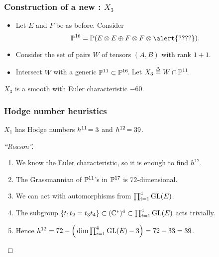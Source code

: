 \begin{frame}
    \frametitle{Construction of a new \CY: $X_3$}

    \begin{itemize}
    	\item
    	Let $E$ and $F$ be as before. Consider
        \[
            \P^{16} = \P(E \otimes E \oplus F \otimes F \otimes\alert{????}).
        \]
        
        \item
        Consider the set of pairs $W$ of tensors $(A, B)$ with rank $1 + 1$.

        \item
        Intersect $W$ with a generic $\P^{11} \subset \P^{16}\mkern-4mu$. Let $X_3 \defeq  W \cap \P^{11}\mkern-4mu$.
    \end{itemize}

    \begin{theorem}
        $X_3$ is a smooth \CY with Euler characteristic $-60$.
    \end{theorem}
\end{frame}

\begin{frame}
    \frametitle{Hodge number heuristics}

    \begin{conjecture}
        $X_1$ has Hodge numbers $h^{11}\mkern-3mu = 3$ and $h^{12}\mkern-2mu = 39$.
    \end{conjecture}

    \begin{proof}[``Reason'']
        \begin{enumerate}[<+->]
            \item
	        We know the Euler characteristic, so it is enough to find $h^{12}$.

            \item
            The Grassmannian of $\P^{11}$'s in $\P^{17}$ is $72$-dimensional.

            \item
            We can act with automorphisms from $\prod_{i = 1}^4 \GL(E)$.

            \item
            The subgroup $\{ t_1t_2 = t_3t_4 \} \subset (\C^\ast)^4 \subset \prod_{i = 1}^4 \GL(E)$ acts trivially.
            \vspace*{-0.5ex}

            \item
            Hence $h^{12} = 72 - \Big(\dim \prod_{i = 1}^4 \GL(E) - 3\Big) = 72-33 = 39$.
            \qedhere
        \end{enumerate}
    \end{proof}
\end{frame}

